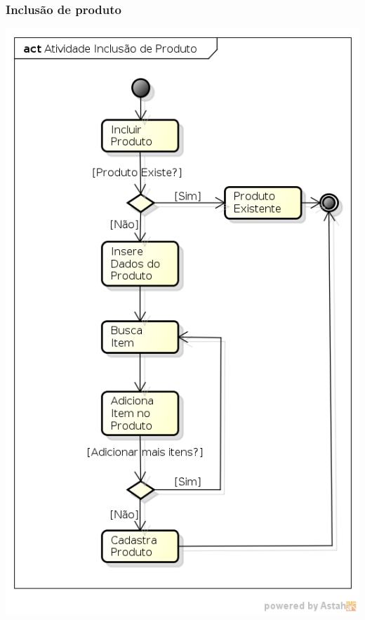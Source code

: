 \subsubsection{Inclusão de produto}
\centerline{
\includegraphics[scale=0.7]{diagrama/Atividade_Inclusao_de_Produto.png}
}
\let\cleardoublepage\clearpage
\newpage
